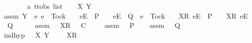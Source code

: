 \begin{isabellebody}
\isamarkupfalse%
\isanewline
\ \ \isamarkupfalse%
\ {\isasymsigma}\ {\isasymrho}{\isacharprime}\ {\isasymsigma}{\isacharprime}\ {\isacharcolon}{\isacharcolon}\ {\isachardoublequoteopen}{\isacharprime}a\ ttobs\ list{\isachardoublequoteclose}\isanewline
\ \ \isamarkupfalse%
\ X\ Y\isanewline
\ \ \isamarkupfalse%
\ assm{}{\isacharcolon}\ {\isachardoublequoteopen}Y\ {\isasyminter}\ {\isacharbraceleft}e{\isachardot}\ e\ {\isasymnoteq}\ Tock\ {\isasymand}\ {\isasymrho}{\isacharprime}\ {\isacharat}\ {\isacharbrackleft}{\isacharbrackleft}e{\isacharbrackright}\isactrlsub E{\isacharbrackright}\ {\isasymin}\ P\ {\isasymand}\ {\isasymrho}{\isacharprime}\ {\isacharat}\ {\isacharbrackleft}{\isacharbrackleft}e{\isacharbrackright}\isactrlsub E{\isacharbrackright}\ {\isasymin}\ Q\ {\isasymor}\ e\ {\isacharequal}\ Tock\ {\isasymand}\ {\isasymrho}{\isacharprime}\ {\isacharat}\ {\isacharbrackleft}{\isacharbrackleft}X{\isacharbrackright}\isactrlsub R{\isacharcomma}\ {\isacharbrackleft}e{\isacharbrackright}\isactrlsub E{\isacharbrackright}\ {\isasymin}\ P\ {\isasymand}\ {\isasymrho}{\isacharprime}\ {\isacharat}\ {\isacharbrackleft}{\isacharbrackleft}X{\isacharbrackright}\isactrlsub R{\isacharcomma}\ {\isacharbrackleft}e{\isacharbrackright}\isactrlsub E{\isacharbrackright}\ {\isasymin}\ Q{\isacharbraceright}\ {\isacharequal}\ {\isacharbraceleft}{\isacharbraceright}{\isachardoublequoteclose}\isanewline
\ \ \isamarkupfalse%
\ assm{}{\isacharcolon}\ {\isachardoublequoteopen}{\isasymrho}{\isacharprime}\ {\isacharat}\ {\isacharbrackleft}X{\isacharbrackright}\isactrlsub R\ {\isacharhash}\ {\isasymsigma}{\isacharprime}\ {\isasymlesssim}\isactrlsub C\ {\isasymsigma}{\isachardoublequoteclose}\isanewline
\ \ \isamarkupfalse%
\ assm{}{\isacharcolon}\ {\isachardoublequoteopen}{\isasymsigma}\ {\isasymin}\ P{\isachardoublequoteclose}\isanewline
\ \ \isamarkupfalse%
\ assm{}{\isacharcolon}\ {\isachardoublequoteopen}{\isasymsigma}\ {\isasymin}\ Q{\isachardoublequoteclose}\isanewline
\ \ \isamarkupfalse%
\ ind{\isacharunderscore}hyp{\isacharcolon}\ {\isachardoublequoteopen}{\isasymforall}{\isasymrho}\ {\isasymsigma}{\isacharprime}\ X\ Y{\isachardot}\ {\isasymsigma}\ {\isacharequal}\ {\isasymrho}\ {\isacharat}\ {\isacharbrackleft}X{\isacharbrackright}\isactrlsub R\ {\isacharhash}\ {\isasymsigma}{\isacharprime}\isanewline

\end{isabellebody}
